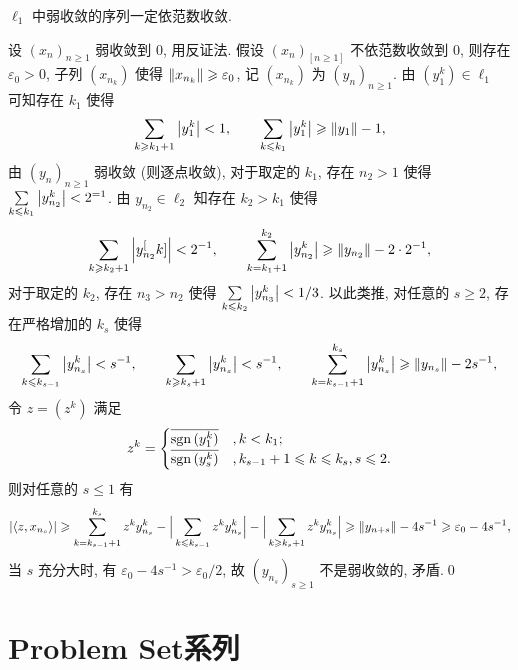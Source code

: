 	\begin{Proposition}
		$ \ell_{1} $ 中弱收敛的序列一定依范数收敛. 
	\end{Proposition}
	\begin{Proof}
		设 $ (x_{n})_{n\geqslant1} $ 弱收敛到 0, 用反证法. 假设 $ (x_{n})_[n\geqslant1] $ 不依范数收敛到 0, 则存在 $ \varepsilon_{0}>0 $, 子列 $ (x_{n_{k}}) $ 使得 $ \left\| x_{n_{k}} \right\|\geqslant\varepsilon_{0} $, 记 $ (x_{n_{k}}) $ 为 $ (y_{n})_{n\geqslant1} $. 由 $ (y_{1}^{k})\in\ell_{1} $ 可知存在 $ k_{1} $ 使得
		\[
			\sum_{k\geqslant k_{1}+1}\left| y_{1}^{k} \right| <1, \qquad \sum_{k\leqslant k_{1}}\left| y_{1}^{k} \right| \geqslant\left\| y_{1} \right\|-1,
		\]
		由 $ (y_{n})_{n\geqslant1} $ 弱收敛 (则逐点收敛), 对于取定的 $ k_{1} $, 存在 $ n_{2}>1 $ 使得 $ \sum\limits_{k\leqslant k_{1}}\left| y_{n_{2}}^{k} \right| <2^{=1} $. 由 $ y_{n_{2}}\in\ell_{2} $ 知存在 $ k_{2}>k_{1} $ 使得
		\[
			\sum_{k\geqslant k_{2}+1}\left| y_{n_{2}}^[k] \right| <2^{-1}, \qquad \sum_{k = k_{1}+1}^{k_{2}}\left| y_{n_{2}}^{k} \right| \geqslant \left\| y_{n_{2}} \right\|-2\cdot2^{-1}, 
		\]
		对于取定的 $ k_{2} $, 存在 $ n_{3}>n_{2} $ 使得 $ \sum\limits_{k\leqslant k_{2}}\left| y_{n_{3}}^{k} \right| <1/3 $. 以此类推, 对任意的 $ s\geqslant 2 $, 存在严格增加的 $ k_{s} $ 使得
		\[
			\sum_{k\leqslant k_{s-1}}\left| y_{n_{s}}^{k} \right| < s^{-1},\qquad \sum_{k\geqslant k_{s}+1}\left| y_{n_{s}}^{k} \right| < s^{-1}, \qquad \sum_{k = k_{s-1}+1}^{k_{s}} \left| y_{n_{s}}^{k} \right| \geqslant \left\| y_{n_{s}} \right\|-2s^{-1},
		\]
		令 $ z=(z^{k}) $ 满足
		\[
			z^{k}=\begin{cases}
				\overline{\mathrm{sgn}\,(y_{1}^{k})} & , k<k_{1};\\
				\overline{\mathrm{sgn}\,(y_{s}^{k})} & , k_{s-1}+1\leqslant k\leqslant k_{s}, s\leqslant 2.
			\end{cases}
		\]
		则对任意的 $ s\leqslant1 $ 有
		\[
			\left| \left\langle z, x_{n_{s}} \right\rangle \right| \geqslant \sum_{k=k_{s-1}+1}^{k_{s}}z^{k}y_{n_{s}}^{k}-\Big| \sum_{k\leqslant k_{s-1}}z^{k}y_{n_{s}}^{k} \Big| -\Big| \sum_{k\geqslant k_{s}+1}z^{k}y_{n_{s}}^{k} \Big| \geqslant\left\| y_{n+{s}} \right\|-4s^{-1}\geqslant\varepsilon_{0}-4s^{-1},
		\]
		当 $ s $ 充分大时, 有 $ \varepsilon_{0}-4s^{-1}>\varepsilon_{0}/2 $, 故 $ (y_{n_{s}})_{s\geqslant1} $ 不是弱收敛的, 矛盾.\qed
	\end{Proof}

\section{Problem Set系列}


